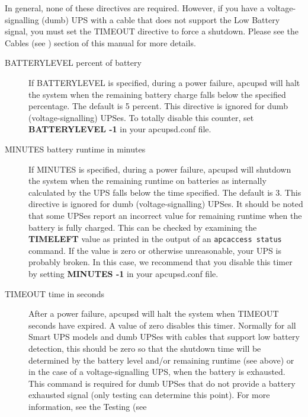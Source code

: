 {{{{{{{\label{index-Directives_002c-Power-fail-243}
\label{index-Power-fail-directives-244}
In general, none of these directives are required. However, if you have a
voltage-signalling (dumb) UPS with a cable that does not support the Low
Battery signal, you must set the TIMEOUT directive to force a shutdown. Please
see the Cables (see 
) section of this manual for more details.  

\begin{description}

\item [BATTERYLEVEL \lt{}percent of battery\gt{}]
   If BATTERYLEVEL is specified, during a power failure, apcupsd will halt the
system when the remaining battery charge falls below the specified percentage.
The default is 5 percent. This directive is ignored for dumb
(voltage-signalling) UPSes. To totally disable this counter, set {\bf
BATTERYLEVEL -1} in your apcupsd.conf file.  

\item [MINUTES \lt{}battery runtime in minutes\gt{}]
   If MINUTES is specified, during a power failure, apcupsd will shutdown the
system when the remaining runtime on batteries as internally calculated by the
UPS falls below the time specified. The default is 3. This directive is
ignored for dumb (voltage-signalling) UPSes. It should be noted that some
UPSes report an incorrect value for remaining runtime when the battery is
fully charged. This can be checked by examining the {\bf TIMELEFT} value as
printed in the output of an {\tt apcaccess status} command. If the value is
zero or otherwise unreasonable, your UPS is probably broken. In this case, we
recommend that you disable this timer by setting {\bf MINUTES -1} in your
apcupsd.conf file.  

\item [TIMEOUT \lt{}time in seconds\gt{}]
   After a power failure, apcupsd will halt the system when TIMEOUT seconds have
expired.  A value of zero disables this timer. Normally for all Smart UPS
models and dumb UPSes with cables that support low battery detection, this
should be zero so that the shutdown time will be determined by the battery
level and/or remaining runtime (see above) or in the case of a
voltage-signalling UPS, when the battery is exhausted.  This command is
required for dumb UPSes that do not provide a battery exhausted signal (only
testing can determine this point).  For more information, see the Testing (see


\end{description}}}}}}}}
